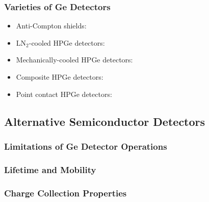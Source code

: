 \subsubsection{Varieties of Ge Detectors}
\begin{itemize}
    \item Anti-Compton shields:
    \item LN$_2$-cooled HPGe detectors:
    \item Mechanically-cooled HPGe detectors:
    \item Composite HPGe detectors:
    \item Point contact HPGe detectors:
\end{itemize}

\subsection{Alternative Semiconductor Detectors}
\subsubsection{Limitations of Ge Detector Operations}
\subsubsection{Lifetime and Mobility}
\subsubsection{Charge Collection Properties}